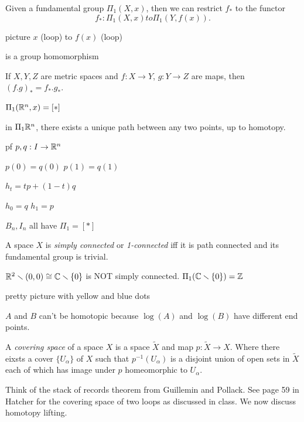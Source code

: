 \documentclass[11pt,leqno,oneside]{amsart}
\numberwithin{thm}{section}
\newcommand{\minus}{\smallsetminus}
\newcommand{\de}{\emph}
\begin{document}
\begin{prop}
  Given a fundamental group $\Pi_1(X, x)$, then we can restrict $f_*$
  to the functor $$f_* : \Pi_1(X, x) to \Pi_1(Y, f(x)).$$

  picture $x$ (loop) to $f(x)$ (loop)

  is a group homomorphism
\end{prop}
\begin{prop}
  If $X,Y,Z$ are metric spaces and $f: X \to Y$, $g: Y \to Z$ are
  maps, then ${(f.g)}_* = f_*.g_*$.
\end{prop}

\begin{example}
  $\Pi_1({\mathbb R}^n, x) = [*]$

  in $\Pi_1 {\mathbb R}^n$, there exists a unique path between any two points,
  up to homotopy.

  pf $p,q: I \to {\mathbb R}^n$

  $p(0) = q(0)$ $p(1) = q(1)$

  $h_t = tp + (1-t)q$

  $h_0 = q$ $h_1 = p$

  $B_n, I_n$ all have $\Pi_1 = [*]$
\end{example}

\begin{thm}[Hatcher 1.6]
  A space $X$ is \de{simply connected} or \de{1-connected} iff it is path connected and its
  fundamental group is trivial.
\end{thm}
\begin{example}
  $\R^2 \minus (0,0) \isom \C \minus \{0\}$ is NOT simply connected.
  $\Pi_1(\C \minus \{0\}) = \Z$
\end{example}
\begin{example}
  pretty picture with yellow and blue dots

  $A$ and $B$ can't be homotopic because $\log(A)$ and $\log(B)$ have
  different end points.
\end{example}

\begin{defn}
  A \emph{covering space} of a space \(X\) is a space \(\tilde{X}\)
  and map \(p \colon \tilde{X} \to X\). Where there eixsts a cover
  \(\{U_\alpha\}\) of \(X\) such that \(p^{-1}(U_\alpha)\) is a
  disjoint union of open sets in \(\tilde{X}\) each of which has image
  under \(p\) homeomorphic to \(U_\alpha\).
\end{defn}

Think of the stack of records theorem from Guillemin and Pollack. See
page 59 in Hatcher for the covering space of two loops as discussed in
class. We now discuss homotopy lifting.
\end{document}
